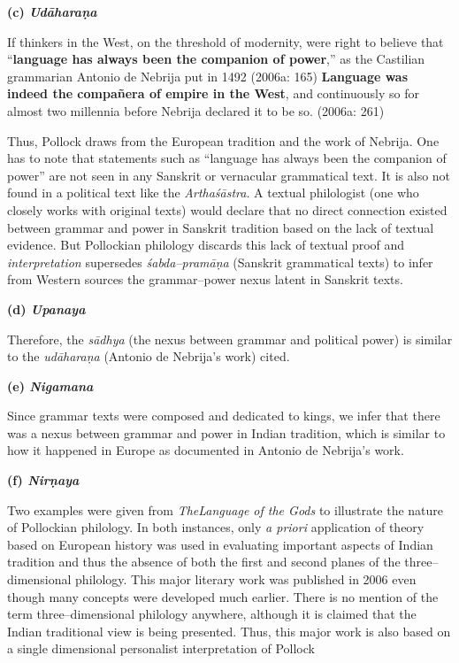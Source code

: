 \textbf{(c) \textit{Udāharaṇa}}

\begin{myquote}
If thinkers in the West, on the threshold of modernity, were right to believe that “\textbf{language has always been the companion of power},” as the Castilian grammarian Antonio de Nebrija put in 1492 (2006a: 165) \textbf{Language was indeed the compañera of empire in the West}, and continuously so for almost two millennia before Nebrija declared it to be so. (2006a: 261)
\end{myquote}

Thus, Pollock draws from the European tradition and the work of Nebrija. One has to note that statements such as “language has always been the companion of power” are not seen in any Sanskrit or vernacular grammatical text. It is also not found in a political text like the \textit{Arthaśāstra}. A textual philologist (one who closely works with original texts) would declare that no direct connection existed between grammar and power in Sanskrit tradition based on the lack of textual evidence. But Pollockian philology discards this lack of textual proof and \textit{interpretation} supersedes \textit{śabda–pramāṇa} (Sanskrit grammatical texts) to infer from Western sources the grammar–power nexus latent in Sanskrit texts.

\textbf{(d) \textit{Upanaya}}

Therefore, the \textit{sādhya} (the nexus between grammar and political power) is similar to the \textit{udāharaṇa} (Antonio de Nebrija’s work) cited.

\textbf{(e) \textit{Nigamana}}

Since grammar texts were composed and dedicated to kings, we infer that there was a nexus between grammar and power in Indian tradition, which is similar to how it happened in Europe as documented in Antonio de Nebrija’s work.

\textbf{(f) \textit{Nirṇaya}}

Two examples were given from \textit{TheLanguage of the Gods} to illustrate the nature of Pollockian philology. In both instances, only \textit{a priori} application of theory based on European history was used in evaluating important aspects of Indian tradition and thus the absence of both the first and second planes of the three–dimensional philology. This major literary work was published in 2006 even though many concepts were developed much earlier. There is no mention of the term three–dimensional philology anywhere, although it is claimed that the Indian traditional view is being presented. Thus, this major work is also based on a single dimensional personalist interpretation of Pollock


